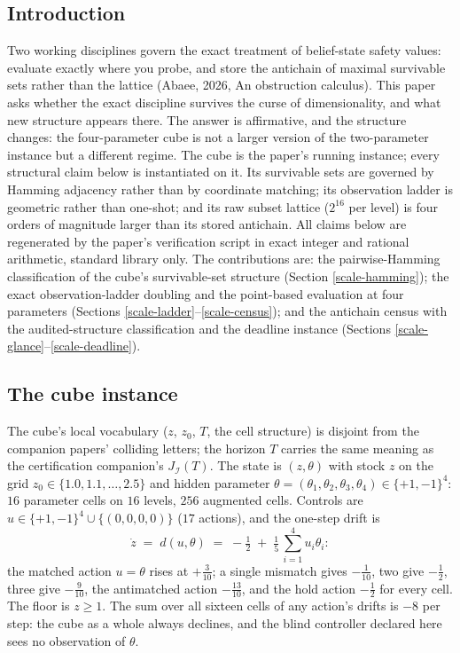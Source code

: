 \documentclass[10pt,twocolumn]{article}
\theoremstyle{plain}
\theoremstyle{definition}
\theoremstyle{remark}
\begin{document}
\subsection{Introduction}\label{scale-introduction}

Two working disciplines govern the exact treatment of belief-state safety values: evaluate exactly where you probe, and store the antichain of maximal survivable sets rather than the lattice (Abaee, 2026, An obstruction calculus). This paper asks whether the exact discipline survives the curse of dimensionality, and what new structure appears there. The answer is affirmative, and the structure changes: the four-parameter cube is not a larger version of the two-parameter instance but a different regime. The cube is the paper's running instance; every structural claim below is instantiated on it.
Its survivable sets are governed by Hamming adjacency rather than by
coordinate matching; its observation ladder is geometric rather than
one-shot; and its raw subset lattice (\(2^{16}\) per level) is four
orders of magnitude larger than its stored antichain. All claims below
are regenerated by the paper's verification script in exact integer
and rational arithmetic, standard library only. The contributions are:
the pairwise-Hamming classification of the cube's survivable-set
structure (Section \ref{scale-hamming}); the exact observation-ladder
doubling and the point-based evaluation at four parameters (Sections
\ref{scale-ladder}--\ref{scale-census}); and the antichain census with the
audited-structure classification and the deadline instance (Sections
\ref{scale-glance}--\ref{scale-deadline}).

\subsection{The cube instance}\label{scale-instance}

The cube's local vocabulary (\(z\), \(z_{0}\), \(T\), the cell
structure) is disjoint from the companion papers' colliding letters;
the horizon \(T\) carries the same meaning as the certification
companion's \(J_{\mathcal{I}}(T)\). The state is \((z, \theta)\) with stock \(z\) on the grid
\(z_{0} \in \{1.0, 1.1, \dots, 2.5\}\) and hidden parameter
\(\theta = (\theta_{1}, \theta_{2}, \theta_{3}, \theta_{4}) \in
\{+1, -1\}^{4}\): \(16\) parameter cells on \(16\) levels, \(256\)
augmented cells. Controls are \(u \in \{+1,-1\}^{4} \cup \{(0,0,0,0)\}\)
(\(17\) actions), and the one-step drift is
\[
\dot z \;=\; d(u, \theta) \;=\; -\tfrac12
\;+\; \tfrac15\,\textstyle\sum_{i=1}^{4} u_{i}\theta_{i}:
\]
the matched action \(u = \theta\) rises at \(+\tfrac3{10}\); a single
mismatch gives \(-\tfrac1{10}\), two give \(-\tfrac12\), three give
\(-\tfrac9{10}\), the antimatched action \(-\tfrac{13}{10}\), and the
hold action \(-\tfrac12\) for every cell. The floor is \(z \ge 1\).
The sum over all sixteen cells of any action's drifts is \(-8\) per
step: the cube as a whole always declines, and the blind controller
declared here sees no observation of \(\theta\).
\end{document}
